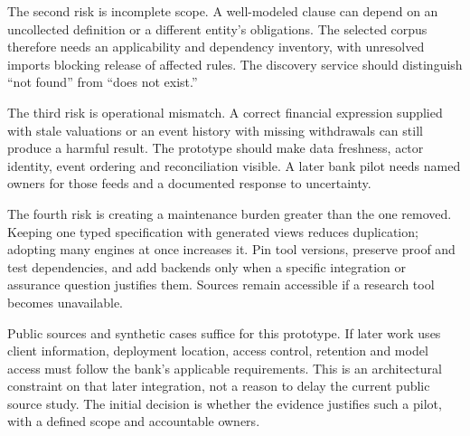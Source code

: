 The second risk is incomplete scope. A well-modeled clause can depend on an
uncollected definition or a different entity's obligations. The selected corpus
therefore needs an applicability and dependency inventory, with unresolved imports
blocking release of affected rules. The discovery service should distinguish
``not found'' from ``does not exist.''

The third risk is operational mismatch. A correct financial expression supplied
with stale valuations or an event history with missing withdrawals can still
produce a harmful result. The prototype should make data freshness, actor
identity, event ordering and reconciliation visible. A later bank pilot needs
named owners for those feeds and a documented response to uncertainty.

The fourth risk is creating a maintenance burden greater than the one removed.
Keeping one typed specification with generated views reduces duplication;
adopting many engines at once increases it. Pin tool versions, preserve proof and
test dependencies, and add backends only when a specific integration or assurance
question justifies them. Sources remain accessible if a research tool becomes
unavailable.

Public sources and synthetic cases suffice for this prototype. If later work
uses client information, deployment location, access control, retention and model
access must follow the bank's applicable requirements. This is an architectural
constraint on that later integration, not a reason to delay the current public
source study. The initial decision is whether the evidence justifies such a pilot,
with a defined scope and accountable owners.
